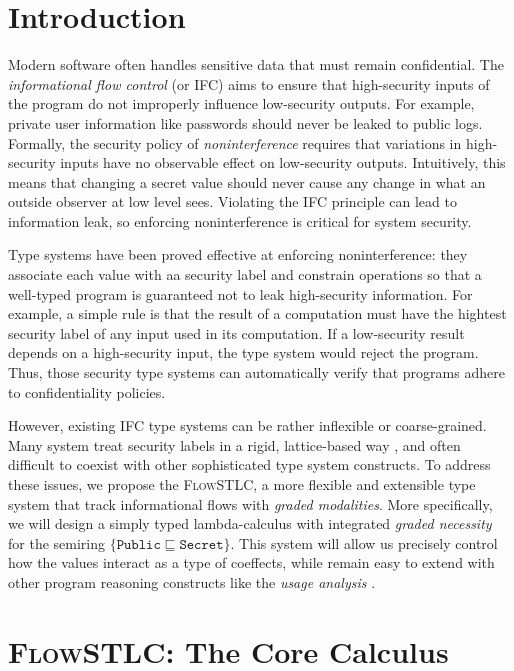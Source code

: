 \documentclass[conference]{IEEEtran}
\newcommand\public{\texttt{Public}}
\newcommand\secret{\texttt{Secret}}
\begin{document}
\section{Introduction}

Modern software often handles sensitive data that must remain confidential. The \emph{informational flow control} (or IFC) aims to ensure that high-security inputs of the program do not improperly influence low-security outputs. For example, private user information like passwords should never be leaked to public logs. Formally, the security policy of \emph{noninterference} requires that variations in high-security inputs have no observable effect on low-security outputs. Intuitively, this means that changing a secret value should never cause any change in what an outside observer at low level sees. Violating the IFC principle can lead to information leak, so enforcing noninterference is critical for system security.

Type systems \cite{sabelfeld2003language} have been proved effective at enforcing noninterference: they associate each value with aa security label and constrain operations so that a well-typed program is guaranteed not to leak high-security information. For example, a simple rule is that the result of a computation must have the hightest security label of any input used in its computation. If a low-security result depends on a high-security input, the type system would reject the program. Thus, those security type systems can automatically verify that programs adhere to confidentiality policies.

However, existing IFC type systems can be rather inflexible or coarse-grained. Many system treat security labels in a rigid, lattice-based way \cite{denning1976lattice}, and often difficult to coexist with other sophisticated type system constructs. To address these issues, we propose the \textsc{FlowSTLC}, a more flexible and extensible type system that track informational flows with \emph{graded modalities}. More specifically, we will design a simply typed lambda-calculus with integrated \emph{graded necessity} for the semiring $\{\public\sqsubseteq\secret\}$. This system will allow us precisely control how the values interact as a type of coeffects, while remain easy to extend with other program reasoning constructs like the \emph{usage analysis} \cite{orchard2019quantitative}.

\section{\textsc{FlowSTLC}: The Core Calculus}
\end{document}
